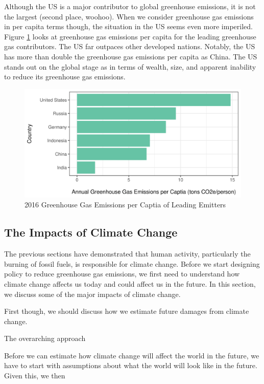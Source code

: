 Although the US is a major contributor to global greenhouse emissions, it is not the largest (second place, woohoo). When we consider greenhouse gas emissions in per capita terms though, the situation in the US seems even more imperiled. Figure \ref{global_ghg_cap} looks at greenhouse gas emissions per capita for the leading greenhouse gas contributors. The US far outpaces other developed nations. Notably, the US has more than double the greenhouse gas emissions per capita as China. The US stands out on the global stage as in terms of wealth, size, and apparent inability to reduce its greenhouse gas emissions.

\begin{figure}
\caption{2016 Greenhouse Gas Emissions per Captia of Leading Emitters \label{global_ghg_cap}}
\centering
\includegraphics[scale=.9]{figures/chapter1_figures/ghg_cap.png}
\end{figure}


\subsection{The Impacts of Climate Change}

The previous sections have demonstrated that human activity, particularly the burning of fossil fuels, is responsible for climate change. Before we start designing policy to reduce greenhouse gas emissions, we first need to understand how climate change affects us today and could affect us in the future. In this section, we discuss some of the major impacts of climate change.

First though, we should discuss how we estimate future damages from climate change. 

The overarching approach 

Before we can estimate how climate change will affect the world in the future, we have to start with assumptions about what the world will look like in the future. Given this, we then 






